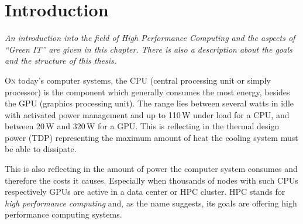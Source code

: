 \renewcommand*{\dictumwidth}{0.5\textwidth}
\chapter{Introduction}
\label{chap:introduction}
\bigskip
\textit{An introduction into the field of High Performance Computing and the aspects of ``Green IT'' are given in this chapter. There is also a description about the goals and the structure of this thesis.}

\bigskip

\lettrine[lines=2, lhang=.1, lraise=.1]{O}{n} today's computer systems, %
the CPU (central processing unit or simply processor) is the component which generally consumes the most energy, besides the GPU (graphics processing unit). The range lies between several watts in idle with activated power management and up to 110\,W under load for a CPU\cite{ht4uCPU}, and between 20\,W and 320\,W for a GPU\cite{ht4uGPU}. This is reflecting in the thermal design power (TDP) representing the maximum amount of heat the cooling system must be able to dissipate. 

This is also reflecting in the amount of power the computer system consumes and therefore the costs it causes. Especially when thousands of nodes with such CPUs respectively GPUs are active in a data center or HPC cluster. HPC stands for \emph{high performance computing} and, as the name suggests, its goals are offering high performance computing systems.

